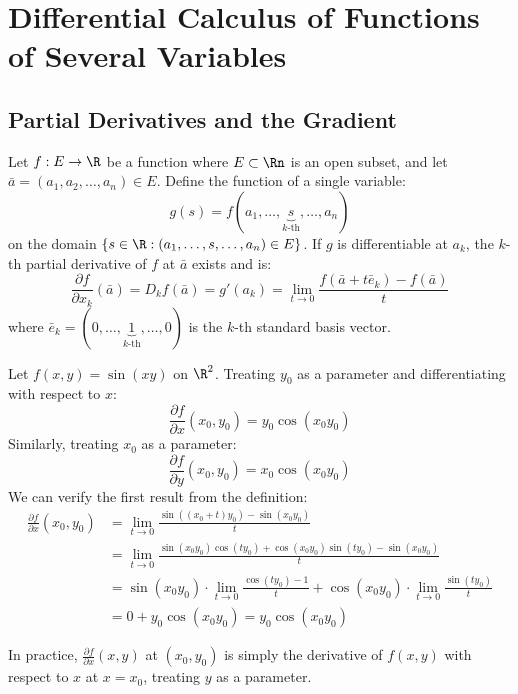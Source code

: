 \chapter{Differential Calculus of Functions of Several Variables}

\section{Partial Derivatives and the Gradient}

\begin{definition}
    Let $f: E \to \R$ be a function where $E \subset \Rn$ is an open subset, and let $\bar{a} = (a_1, a_2, \ldots, a_n) \in E$. Define the function of a single variable:
    \[
        g(s) = f(a_1, \ldots, \underbrace{s}_{k\text{-th}}, \ldots, a_n)
    \]
    on the domain $\{s \in \R : (a_1, \ldots, s, \ldots, a_n) \in E\}$. If $g$ is differentiable at $a_k$, the $k$-th partial derivative of $f$ at $\bar{a}$ exists and is:
    \[
        \frac{\partial f}{\partial x_k}(\bar{a}) = D_k f(\bar{a}) = g'(a_k) = \lim_{t \to 0} \frac{f(\bar{a} + t\bar{e}_k) - f(\bar{a})}{t}
    \]
    where $\bar{e}_k = (0, \ldots, \underbrace{1}_{k\text{-th}}, \ldots, 0)$ is the $k$-th standard basis vector.
\end{definition}

\begin{eg}
    Let $f(x,y) = \sin(xy)$ on $\R^2$. Treating $y_0$ as a parameter and differentiating with respect to $x$:
    \[
        \frac{\partial f}{\partial x}(x_0, y_0) = y_0 \cos(x_0 y_0)
    \]
    Similarly, treating $x_0$ as a parameter:
    \[
        \frac{\partial f}{\partial y}(x_0, y_0) = x_0 \cos(x_0 y_0)
    \]
    We can verify the first result from the definition:
    \begin{align*}
        \frac{\partial f}{\partial x}(x_0, y_0) &= \lim_{t \to 0} \frac{\sin((x_0 + t)y_0) - \sin(x_0 y_0)}{t} \\
        &= \lim_{t \to 0} \frac{\sin(x_0 y_0)\cos(ty_0) + \cos(x_0 y_0)\sin(ty_0) - \sin(x_0 y_0)}{t} \\
        &= \sin(x_0 y_0) \cdot \lim_{t \to 0} \frac{\cos(ty_0) - 1}{t} + \cos(x_0 y_0) \cdot \lim_{t \to 0} \frac{\sin(ty_0)}{t} \\
        &= 0 + y_0 \cos(x_0 y_0) = y_0 \cos(x_0 y_0)
    \end{align*}
\end{eg}
In practice, $\frac{\partial f}{\partial x}(x,y)$ at $(x_0, y_0)$ is simply the derivative of $f(x, y)$ with respect to $x$ at $x = x_0$, treating $y$ as a parameter.

